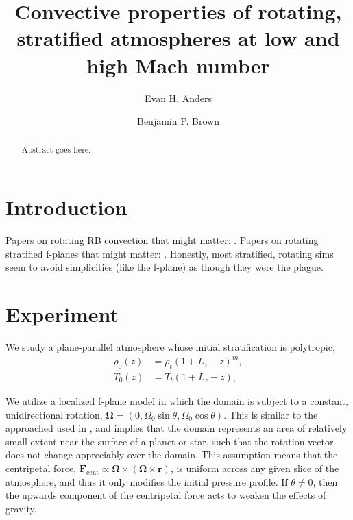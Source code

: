 \documentclass[aps, prl, twocolumn, nofootinbib, groupedaddress, amsfonts, amssymb, amsmath]{revtex4-1}
\begin{document}
\author{Evan H. Anders}
\author{Benjamin P. Brown}
\title{Convective properties of rotating, stratified atmospheres at low and high Mach number}

\begin{abstract}
Abstract goes here.
\end{abstract}
\maketitle


\section{Introduction}
\label{sec:intro}
Papers on rotating RB convection that might matter:
\cite{hathaway&somerville1983, julien&all1996, zhong&all2009, julien&all2012, stellmach&all2014}.
Papers on rotating stratified f-planes that might matter:
\cite{brummell&all1996, brummell&all1998 calkins&all2015a}.  Honestly, most stratified, rotating sims
seem to avoid simplicities (like the f-plane) as though they were the plague.

\section{Experiment} 
\label{sec:experiment}
We study a plane-parallel atmosphere whose initial stratification is polytropic,
\begin{equation}
\begin{split}
\rho_0(z) &= \rho_{t}(1 + L_z - z)^m, \\
T_0(z)    &= T_{t}(1 + L_z - z),
\label{eqn:polytrope}
\end{split}
\end{equation}

We utilize a localized f-plane model in which the domain
is subject to a constant, unidirectional rotation, 
$\bm{\Omega} = (0, \Omega_0 \sin\theta, \Omega_0\cos\theta)$.
This is similar to the approached used in \cite{brummell&all1996}, and
implies that the domain represents an area of relatively small extent near
the surface of a planet or star, such that the rotation vector does not
change appreciably over the domain.  This assumption means that
the centripetal force, 
$\bm{F}_{\text{cent}} \propto \bm{\Omega}\times(\bm{\Omega}\times\bm{r})$,
is uniform across any given slice of the atmosphere, and thus it only modifies the
initial pressure profile.  If $\theta \neq 0$, then the upwards component of the
centripetal force acts to weaken the effects of gravity.
\end{document}
